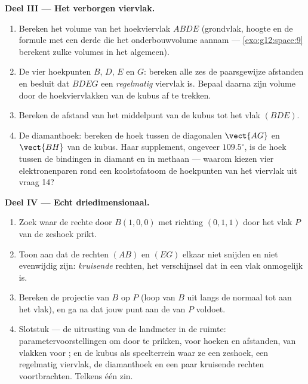 \begin{problem}
\medskip
\noindent\textbf{Deel III --- Het verborgen viervlak.}
\begin{enumerate}[resume]
  \item Bereken het volume van het hoekviervlak $ABDE$ (grondvlak, hoogte en
        de formule met een derde die het onderbouwvolume aannam ---
        \cref{exo:g12:space:9} berekent zulke volumes in het algemeen).
  \item De vier hoekpunten $B$, $D$, $E$ en $G$: bereken alle zes de
        paarsgewijze afstanden en besluit dat $BDEG$ een \emph{regelmatig}
        viervlak is. Bepaal daarna zijn volume door de hoekviervlakken van de
        kubus af te trekken.
  \item Bereken de afstand van het middelpunt van de kubus tot het vlak
        $(BDE)$.
  \item De diamanthoek: bereken de hoek tussen de diagonalen $\vect{AG}$ en
        $\vect{BH}$ van de kubus. Haar supplement, ongeveer $109.5^\circ$, is
        de hoek tussen de bindingen in diamant en in methaan --- waarom kiezen
        vier elektronenparen rond een koolstofatoom de hoekpunten van het
        viervlak uit vraag 14?
\end{enumerate}

\medskip
\noindent\textbf{Deel IV --- Echt driedimensionaal.}
\begin{enumerate}[resume]
  \item Zoek waar de rechte door $B(1,0,0)$ met richting $(0,1,1)$ door het
        vlak $P$ van de zeshoek prikt.
  \item Toon aan dat de rechten $(AB)$ en $(EG)$ elkaar niet snijden en niet
        evenwijdig zijn: \emph{kruisende} rechten, het verschijnsel dat in een
        vlak onmogelijk is.
  \item Bereken de  projectie van $B$ op $P$ (loop van $B$ uit
        langs de normaal tot aan het vlak), en ga na dat jouw punt aan de
         van $P$ voldoet.
  \item Slotstuk --- de uitrusting van de landmeter in de ruimte:
        parametervoorstellingen om door te prikken,  voor
        hoeken en afstanden,  van vlakken voor ; en de
        kubus als speelterrein waar ze een zeshoek, een regelmatig viervlak,
        de diamanthoek en een paar kruisende rechten voortbrachten. Telkens
        één zin.
\end{enumerate}
\end{problem}
